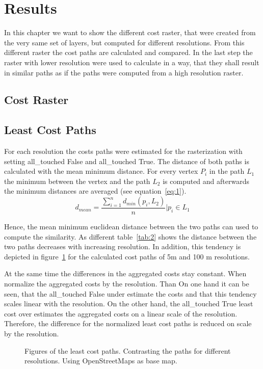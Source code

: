 \documentclass[acmtog]{acmart}
\begin{document}
	\section{Results}
	In this chapter we want to show the different cost raster, that were created from the very same set of layers,
	but computed for different resolutions.
	From this different raster the cost paths are calculated and compared.
	In the last step the raster with lower resolution were used to calculate in a way, that they shall result in
	similar paths as if the paths were computed from a high resolution raster.
	\subsection{Cost Raster}
	\subsection{Least Cost Paths}
	For each resolution the costs paths were estimated for the rasterization with setting all\_touched False
	and all\_touched True.
	The distance of both paths is calculated with the mean minimum distance.
	For every vertex $P_i$ in the path $L_1$ the minimum between the vertex and the path $L_2$
	is computed and afterwards the minimum distances are averaged (see equation~\ref{eq:1}).
	\begin{equation}
		\label{eq:1}
		d_{mean} = \frac{\sum_{i=1}^{n} d_{min}(p_i, L_2)}{n} \bigg\vert p_i \in L_1
	\end{equation}

	Hence, the mean minimum euclidean distance between the two paths can used to compute
	the similarity.
	As different table~\ref{tab:2} shows the distance between the two paths decreases
	with increasing resolution.
	In addition, this tendency is depicted in figure~\ref{fig:paths_resolution} for the calculated cost paths of 5m and 100 m resolutions.
	
	At the same time the differences in the aggregated costs stay constant.
	 When normalize the aggregated costs by the resolution.
	Than On one hand it can be seen, that the all\_touched False under estimate the costs and that this tendency scales
	linear with the resolution.
	On the other hand, the all\_touched True least cost over estimates the aggregated costs on a linear scale of
	the resolution.
	Therefore, the difference for the normalized least cost paths is reduced on scale by the resolution.
	
	\begin{figure}
		\centering
		
		\qquad
		\caption{Figures of the least cost paths. Contrasting the paths for different resolutions. Using OpenStreetMaps as base map.}
		\label{fig:paths_resolution}
	\end{figure}
\end{document}
